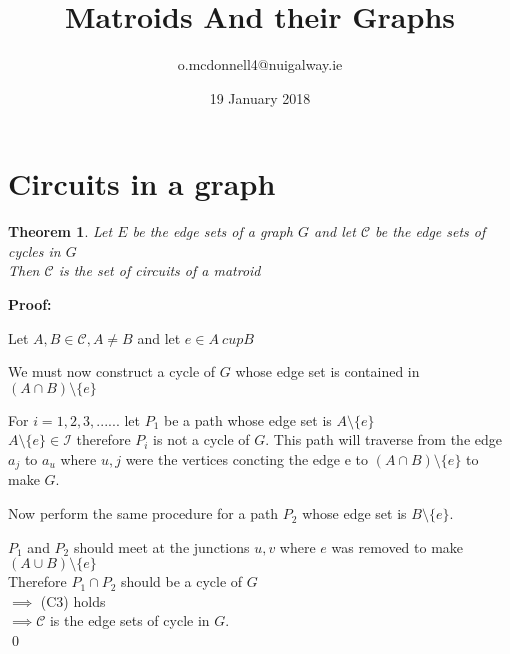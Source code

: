 \documentclass{article}
\title{Matroids And their Graphs}
\author{o.mcdonnell4@nuigalway.ie }
\date{19 January 2018}
\theoremstyle{plain}
\newtheorem{thm}{Theorem}[section]
\theoremstyle{definition}
\theoremstyle{remark}
\newcommand\Proof{%
    \textbf{Proof:}~%
}
\begin{document}
\maketitle
 \section{Circuits in a graph}
 
 \begin{thm}
 Let $E$ be the edge sets of a graph $G$ and let $\mathcal{C}$ be the edge sets of cycles in $G$\\
 \noindent Then $\mathcal{C}$ is the set of circuits of a matroid

 \end{thm}

\noindent\textbf\Proof
Let $A, B \in \mathcal{C}, A \neq B $ and let $e \in A \ cup B $

\vspace{1mm}

\noindent We must now construct a cycle of $G$ whose edge set is contained in $(A \cap B) \setminus \{e\}$

\vspace{2mm}

\noindent For $ i = 1,2,3,...... $ let $P_1$ be a path whose edge set is $ A \setminus \{e\}$\\
\noindent $ A \setminus \{e\} \in \mathcal{I} $ therefore $P_i$ is not a cycle of $G$. This path will traverse from the edge $a_j$ to $a_u$ where $u,j$ were the vertices concting the edge e to $(A \cap B) \setminus \{e\}$ to make $G$.

\vspace{2mm}

\noindent Now perform the same procedure for a path $P_2$ whose edge set is $B \setminus \{e\}$.

\vspace{2mm}

\noindent $P_1$ and $P_2$ should meet at the junctions $u,v$  where $e$ was removed to make $ (A \cup B) \setminus \{e\}$\\
\noindent Therefore $P_1 \cap P_2$ should be a cycle of $G$\\
\noindent $\implies$ (C3) holds\\
\noindent $\implies \mathcal{C}$ is the edge sets of cycle in $G$.\\
\qed
\end{document}
